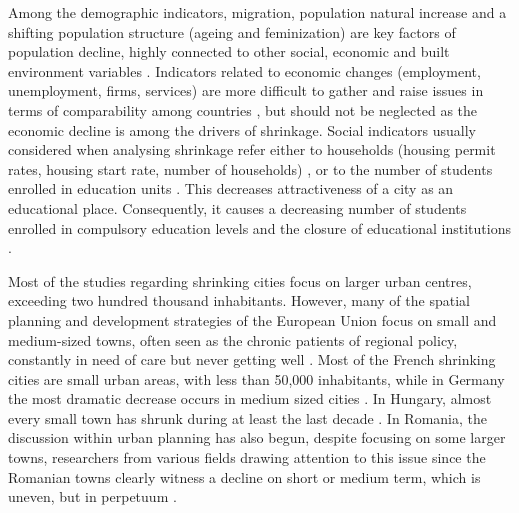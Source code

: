 Among the demographic indicators, migration, population natural increase and a shifting population structure (ageing and feminization) are key factors of population decline, highly connected to other social, economic and built environment variables \citep{turok_trajectories_2007, guimaraes_shrinking_2015, haase_varieties_2016, banica_challenges_2017, cauchi-duval_decroissance_2017, hartt_how_2018}. Indicators related to economic changes (employment, unemployment, firms, services) are more difficult to gather and raise issues in terms of comparability among countries \citep{martinez-fernandez_shrinking_2015}, but should not be neglected as the economic decline is among the drivers of shrinkage. Social indicators usually considered when analysing shrinkage refer either to households (housing permit rates, housing start rate, number of households) \citep{bontje_facing_2004, wolff_indicators_2014, guimaraes_shrinking_2015, lauf_effects_2016, hartt_how_2018}, or to the number of students enrolled in education units \citep{guimaraes_shrinking_2015}. This decreases attractiveness of a city as an educational place. Consequently, it causes a decreasing number of students enrolled in compulsory education levels and the closure of educational institutions \citep{wolff_indicators_2014}.

Most of the studies regarding shrinking cities focus on larger urban centres, exceeding two hundred thousand inhabitants. However, many of the spatial planning and development strategies of the European Union focus on small and medium-sized towns, often seen as the chronic patients of regional policy, constantly in need of care but never getting well \citep{wirth_peripheralisation_2016}. Most of the French shrinking cities are small urban areas, with less than 50,000 inhabitants, while in Germany the most dramatic decrease occurs in medium sized cities \citep{martinez-fernandez_shrinking_2015}. In Hungary, almost every small town has shrunk during at least the last decade \citep{pirisi_between_2015}. In Romania, the discussion within urban planning has also begun, despite focusing on some larger towns, researchers from various fields drawing attention to this issue \citep{banica_challenges_2017, jucu_economic_2016, jucu_post-communist_2019, paun_constantinescu_shrinking_2019, popescu_deindustrialization_2014, schoenberg_urban_2014, stoica_exploring_2020, steinfuhrer_small_2020} since the Romanian towns clearly witness a decline on short or medium term, which is uneven, but in perpetuum \citep{paun_constantinescu_shrinking_2013}.

